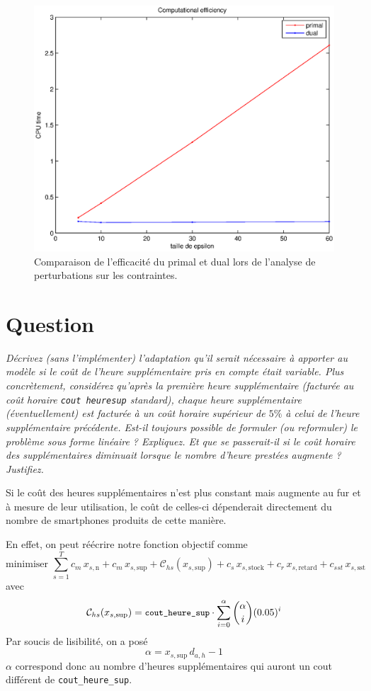 \documentclass[12pt,oneside,a4paper]{article}
\newcommand{\question}
{
\addtocounter{section}{1}
\section*{Question \thesection}
}
\newcommand{\myX}[2]{x_{#1,\text{#2}}}
\newcommand{\xSemaine}[1]{\myX{s}{#1}}
\newcommand{\xn}{\xSemaine{n}}
\newcommand{\xsup}{\xSemaine{sup}}
\newcommand{\xstock}{\xSemaine{stock}}
\newcommand{\xretard}{\xSemaine{retard}}
\newcommand{\xsst}{\xSemaine{sst}}
\newcommand{\texttts}[1]{{\small\texttt{#1}}}
\begin{document}
\begin{figure}
  \begin{center}
    \includegraphics[scale=0.6]{img/efficiencyDual.eps}
    \caption{Comparaison de l'efficacité du primal et dual lors de
    l'analyse de perturbations sur les contraintes.}
    \label{fig:efficiencyDual}
  \end{center}
\end{figure}

\question %
\emph{Décrivez (sans l'implémenter) l'adaptation qu'il serait nécessaire à
apporter au modèle si le coût de l'heure supplémentaire pris en compte était
variable. Plus concrètement, considérez qu'après la première heure
supplémentaire (facturée au coût horaire \texttt{cout\textunderscore
heure\textunderscore sup} standard), chaque heure supplémentaire
(éventuellement) est facturée à un coût horaire supérieur de $5 \%$ 
à celui de l'heure supplémentaire précédente. 
Est-il toujours possible de formuler (ou reformuler) 
le problème sous forme linéaire ? Expliquez. 
Et que se passerait-il si le coût horaire des supplémentaires \emph{diminuait}
lorsque le nombre d'heure prestées augmente ? Justifiez.}

Si le coût des heures supplémentaires n'est plus constant mais augmente au fur et à mesure de leur utilisation, 
le coût de celles-ci dépenderait directement du nombre de smartphones 
produits de cette manière.

En effet, on peut réécrire notre fonction objectif comme
\[
  \mbox{minimiser } 
  \sum_{s=1}^{T} 
  c_m\, \xn + c_m \, \xsup + \mathcal{C}_{hs} (\xsup)
  + c_s\, \xstock + c_r\, \xretard + c_{sst}\, \xsst
\]
avec
\[
  \mathcal{C}_{hs} (\xsup) = \texttts{cout\_heure\_sup} \cdot
  \sum_{i=0}^{\alpha} \binom{\alpha}{i} (0.05)^{i} 
\]
Par soucis de lisibilité, on a posé
\[ \alpha = \xsup \, d_{a,h} - 1 \]
$\alpha$ correspond donc au nombre d'heures supplémentaires qui auront
un cout différent de \texttt{cout\_heure\_sup}.
\end{document}
